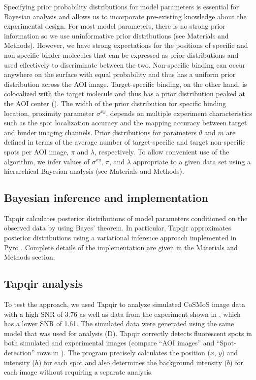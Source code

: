 Specifying prior probability distributions for model parameters is essential for Bayesian analysis and allows us to incorporate pre-existing knowledge about the experimental design. For most model parameters, there is no strong prior information so we use uninformative prior distributions (see Materials and Methods). However, we have strong expectations for the positions of specific and non-specific binder molecules that can be expressed as prior distributions and used effectively to discriminate between the two. Non-specific binding can occur anywhere on the surface with equal probability and thus has a uniform prior distribution across the AOI image. Target-specific binding, on the other hand, is colocalized with the target molecule and thus has a prior distribution peaked at the AOI center (). The width of the prior distribution for specific binding location, proximity parameter $\sigma^{xy}$, depends on multiple experiment characteristics such as the spot localization accuracy and the mapping accuracy between target and binder imaging channels. Prior distributions for parameters $\theta$ and $m$ are defined in terms of the average number of target-specific and target non-specific spots per AOI image, $\pi$ and $\lambda$, respectively. To allow convenient use of the algorithm, we infer values of $\sigma^{xy}$, $\pi$, and $\lambda$ appropriate to a given data set using a hierarchical Bayesian analysis (see Materials and Methods).

\subsection{Bayesian inference and implementation}

Tapqir calculates posterior distributions of model parameters conditioned on the observed data by using Bayes' theorem. In particular, Tapqir approximates posterior distributions using a variational inference approach implemented in Pyro \citep{Bingham2019-qy}.  Complete details of the implementation are given in the Materials and Methods section.

\subsection{Tapqir analysis}

To test the approach, we used Tapqir to analyze simulated CoSMoS image data with a high SNR of 3.76 as well as data from the experiment shown in , which has a lower SNR of 1.61. The simulated data were generated using the same model that was used for analysis (D). Tapqir correctly detects fluorescent spots in both simulated and experimental images (compare ``AOI images'' and ``Spot-detection'' rows in ). The program precisely calculates the position ($x$, $y$) and intensity ($h$) for each spot and also determines the background intensity ($b$) for each image without requiring a separate analysis. 

